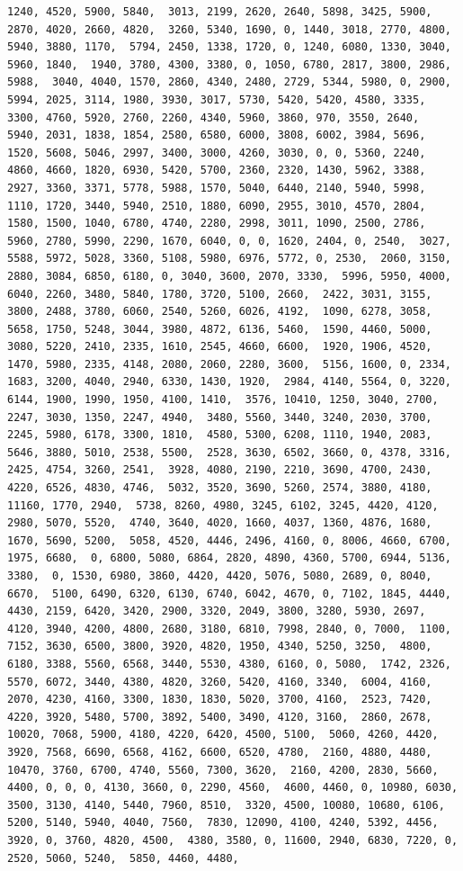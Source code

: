 \documentclass[
]{article}
\begin{document}
\begin{verbatim}
1240, 4520, 5900, 5840,  3013, 2199, 2620, 2640, 5898, 3425, 5900, 2870, 4020, 2660, 4820,  3260, 5340, 1690, 0, 1440, 3018, 2770, 4800, 5940, 3880, 1170,  5794, 2450, 1338, 1720, 0, 1240, 6080, 1330, 3040, 5960, 1840,  1940, 3780, 4300, 3380, 0, 1050, 6780, 2817, 3800, 2986, 5988,  3040, 4040, 1570, 2860, 4340, 2480, 2729, 5344, 5980, 0, 2900,  5994, 2025, 3114, 1980, 3930, 3017, 5730, 5420, 5420, 4580, 3335,  3300, 4760, 5920, 2760, 2260, 4340, 5960, 3860, 970, 3550, 2640,  5940, 2031, 1838, 1854, 2580, 6580, 6000, 3808, 6002, 3984, 5696,  1520, 5608, 5046, 2997, 3400, 3000, 4260, 3030, 0, 0, 5360, 2240,  4860, 4660, 1820, 6930, 5420, 5700, 2360, 2320, 1430, 5962, 3388,  2927, 3360, 3371, 5778, 5988, 1570, 5040, 6440, 2140, 5940, 5998,  1110, 1720, 3440, 5940, 2510, 1880, 6090, 2955, 3010, 4570, 2804,  1580, 1500, 1040, 6780, 4740, 2280, 2998, 3011, 1090, 2500, 2786,  5960, 2780, 5990, 2290, 1670, 6040, 0, 0, 1620, 2404, 0, 2540,  3027, 5588, 5972, 5028, 3360, 5108, 5980, 6976, 5772, 0, 2530,  2060, 3150, 2880, 3084, 6850, 6180, 0, 3040, 3600, 2070, 3330,  5996, 5950, 4000, 6040, 2260, 3480, 5840, 1780, 3720, 5100, 2660,  2422, 3031, 3155, 3800, 2488, 3780, 6060, 2540, 5260, 6026, 4192,  1090, 6278, 3058, 5658, 1750, 5248, 3044, 3980, 4872, 6136, 5460,  1590, 4460, 5000, 3080, 5220, 2410, 2335, 1610, 2545, 4660, 6600,  1920, 1906, 4520, 1470, 5980, 2335, 4148, 2080, 2060, 2280, 3600,  5156, 1600, 0, 2334, 1683, 3200, 4040, 2940, 6330, 1430, 1920,  2984, 4140, 5564, 0, 3220, 6144, 1900, 1990, 1950, 4100, 1410,  3576, 10410, 1250, 3040, 2700, 2247, 3030, 1350, 2247, 4940,  3480, 5560, 3440, 3240, 2030, 3700, 2245, 5980, 6178, 3300, 1810,  4580, 5300, 6208, 1110, 1940, 2083, 5646, 3880, 5010, 2538, 5500,  2528, 3630, 6502, 3660, 0, 4378, 3316, 2425, 4754, 3260, 2541,  3928, 4080, 2190, 2210, 3690, 4700, 2430, 4220, 6526, 4830, 4746,  5032, 3520, 3690, 5260, 2574, 3880, 4180, 11160, 1770, 2940,  5738, 8260, 4980, 3245, 6102, 3245, 4420, 4120, 2980, 5070, 5520,  4740, 3640, 4020, 1660, 4037, 1360, 4876, 1680, 1670, 5690, 5200,  5058, 4520, 4446, 2496, 4160, 0, 8006, 4660, 6700, 1975, 6680,  0, 6800, 5080, 6864, 2820, 4890, 4360, 5700, 6944, 5136, 3380,  0, 1530, 6980, 3860, 4420, 4420, 5076, 5080, 2689, 0, 8040, 6670,  5100, 6490, 6320, 6130, 6740, 6042, 4670, 0, 7102, 1845, 4440,  4430, 2159, 6420, 3420, 2900, 3320, 2049, 3800, 3280, 5930, 2697,  4120, 3940, 4200, 4800, 2680, 3180, 6810, 7998, 2840, 0, 7000,  1100, 7152, 3630, 6500, 3800, 3920, 4820, 1950, 4340, 5250, 3250,  4800, 6180, 3388, 5560, 6568, 3440, 5530, 4380, 6160, 0, 5080,  1742, 2326, 5570, 6072, 3440, 4380, 4820, 3260, 5420, 4160, 3340,  6004, 4160, 2070, 4230, 4160, 3300, 1830, 1830, 5020, 3700, 4160,  2523, 7420, 4220, 3920, 5480, 5700, 3892, 5400, 3490, 4120, 3160,  2860, 2678, 10020, 7068, 5900, 4180, 4220, 6420, 4500, 5100,  5060, 4260, 4420, 3920, 7568, 6690, 6568, 4162, 6600, 6520, 4780,  2160, 4880, 4480, 10470, 3760, 6700, 4740, 5560, 7300, 3620,  2160, 4200, 2830, 5660, 4400, 0, 0, 0, 4130, 3660, 0, 2290, 4560,  4600, 4460, 0, 10980, 6030, 3500, 3130, 4140, 5440, 7960, 8510,  3320, 4500, 10080, 10680, 6106, 5200, 5140, 5940, 4040, 7560,  7830, 12090, 4100, 4240, 5392, 4456, 3920, 0, 3760, 4820, 4500,  4380, 3580, 0, 11600, 2940, 6830, 7220, 0, 2520, 5060, 5240,  5850, 4460, 4480, 
\end{verbatim}
\end{document}
